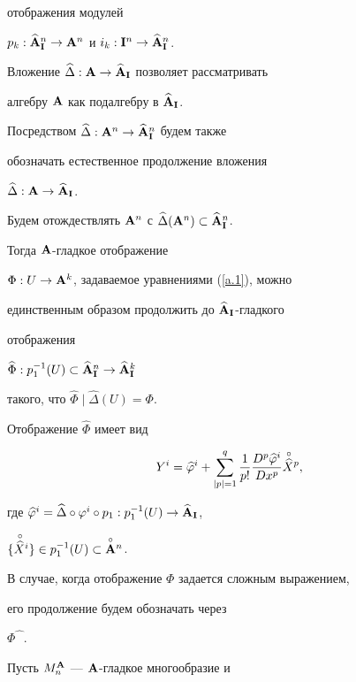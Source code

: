 отображения модулей


$p_k:\widehat{{\bold A}}_{{\bold I}}^n\to{\bold A}^n$ и $i_k:{\bold I}^n\to\widehat{{\bold A}}_{{\bold I}}^n$.


Вложение $\widehat\Delta:{\bold A}\to\widehat{{\bold A}}_{\bold I}$ позволяет рассматривать


алгебру ${\bold A}$ как подалгебру в $\widehat{{\bold A}}_{\bold I}$.


Посредством $\widehat\Delta:{\bold A}^n\to\widehat{{\bold A}}_{\bold I}^n$ будем также


обозначать естественное продолжение вложения


$\widehat\Delta:{\bold A}\to\widehat{{\bold A}}_{\bold I}$.


Будем отождествлять ${\bold A}^n$ с $\widehat\Delta({\bold A}^n)\subset\widehat{{\bold A}}_{\bold I}^n$.


Тогда ${\bold A}$-гладкое отображение


$\Phi:U\to{\bold A}^k$, задаваемое уравнениями (\ref{a.1}), можно


единственным образом продолжить до $\widehat{{\bold A}}_{\bold I}$-гладкого


отображения


$\widehat\Phi:p^{-1}_1(U)\subset\widehat{{\bold A}}_{\bold I}^n\to\widehat{{\bold A}}_{\bold I}^k$


такого, что $\widehat\Phi\mid \widehat\Delta(U)=\Phi$.


Отображение $\widehat\Phi$ имеет вид


\begin{equation}


Y^{i}=\widehat\varphi^{i}+\sum^q_{|p|=1}\frac{1}{p!}


\frac{D^p \widehat\varphi^{i}}{Dx^p}{\puto {\widehat X}}{}^p,


\label{k.6}


\end{equation}


где $\widehat\varphi^{i}=\widehat\Delta\circ\varphi^{i}\circ


p_1:p_1^{-1}(U)\to\widehat\A_\I$,


$\{{\overset{\,\circ}{\widehat X}{}}{}^i\}\in p_1^{-1}(U)\subset\overset{\circ}{{\bold A}}{}^n$.


 


В случае, когда отображение $\Phi$ задается сложным выражением,


его продолжение будем обозначать через


$\Phi\widehat{\phantom \Phi}$.


 


Пусть $M^{\bold A}_n$ --- ${\bold A}$-гладкое многообразие и



